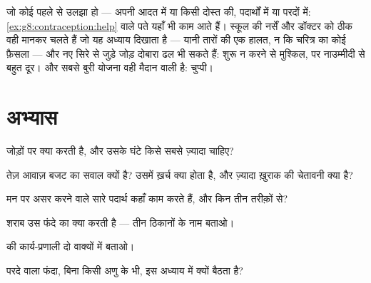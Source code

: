 \begin{example}\label{ex:g8:protecting-the-nervous-system:help}
जो कोई पहले से उलझा हो --- अपनी आदत में या किसी दोस्त की, पदार्थों में
या परदों में: \cref{ex:g8:contraception:help} वाले पते यहाँ भी काम आते
हैं। स्कूल की नर्सें और डॉक्टर  को ठीक वही मानकर चलते हैं जो यह अध्याय
दिखाता है --- यानी तारों की एक हालत, न कि चरित्र का कोई फ़ैसला --- और नए
सिरे से जुड़े जोड़ दोबारा ढल भी सकते हैं: शुरू न करने से मुश्किल, पर
नाउम्मीदी से बहुत दूर। और सबसे बुरी योजना वही मैदान वाली है: चुप्पी।
\end{example}

\section{अभ्यास}

\begin{exercise}[$\star$]\label{exo:g8:protecting-the-nervous-system:1}
 जोड़ों पर क्या करती है, और उसके घंटे किसे सबसे ज़्यादा चाहिए?
\end{exercise}

\begin{exercise}[$\star$]\label{exo:g8:protecting-the-nervous-system:2}
तेज़ आवाज़ बजट का सवाल क्यों है? उसमें ख़र्च क्या होता है, और ज़्यादा
ख़ुराक की चेतावनी क्या है?
\end{exercise}

\begin{exercise}[$\star$]\label{exo:g8:protecting-the-nervous-system:3}
मन पर असर करने वाले सारे पदार्थ कहाँ काम करते हैं, और किन तीन तरीक़ों
से?
\end{exercise}

\begin{exercise}[$\star$]\label{exo:g8:protecting-the-nervous-system:4}
शराब उस फंदे का क्या करती है --- तीन ठिकानों के नाम बताओ।
\end{exercise}

\begin{exercise}[$\star$]\label{exo:g8:protecting-the-nervous-system:5}
 की कार्य-प्रणाली दो वाक्यों में बताओ।
\end{exercise}

\begin{exercise}[$\star$]\label{exo:g8:protecting-the-nervous-system:6}
परदे वाला फंदा, बिना किसी अणु के भी, इस अध्याय में क्यों बैठता है?
\end{exercise}

